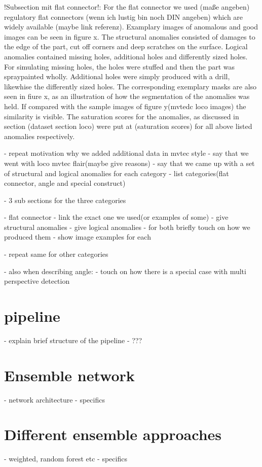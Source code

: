 !Subsection mit flat connector!:
For the flat connector we used (maße angeben) regulatory flat connectors (wenn ich lustig bin noch DIN angeben) which are widely available (maybe link referenz). 
Examplary images of anomalous and good images can be seen in figure x. The structural anomalies consisted of damages to the edge of the part, cut off corners and deep scratches on the surface. 
Logical anomalies contained missing holes, additional holes and differently sized holes. For simulating missing holes, the holes were stuffed and then the part was spraypainted wholly. 
Additional holes were simply produced with a drill, likewhise the differently sized holes. 
The corresponding exemplary masks are also seen in fiure x, as an illustration of how the segmentation of the anomalies was held. If compared with the sample images of figure y(mvtedc loco images) 
the similarity is visible. The saturation scores for the anomalies, as discussed in section (dataset section loco) were put at (saturation scores) for all above listed anomalies respectively.



- repeat motivation why we added additional data in mvtec style
- say that we went with loco mvtec flair(maybe give reasons)
- say that we came up with a set of structural and logical anomalies for each category
- list categories(flat connector, angle and special construct)

- 3 sub sections for the three categories

- flat connector
- link the exact one we used(or examples of some)
- give structural anomalies
- give logical anomalies
- for both briefly touch on how we produced them
- show image examples for each

- repeat same for other categories

- also when describing angle:
- touch on how there is a special case with multi perspective detection


\section{pipeline}
- explain brief structure of the pipeline
- ???


\section{Ensemble network}
- network architecture
- specifics

\section{Different ensemble approaches}
- weighted, random forest etc 
- specifics
